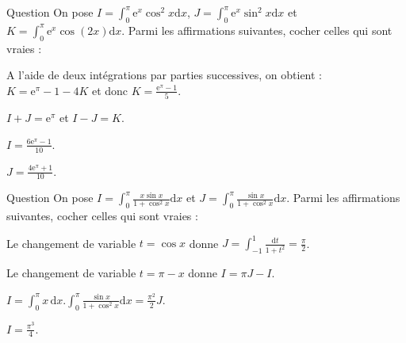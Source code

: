 \begin{multi}[multiple,feedback=
{Deux intégrations par parties successives, avec \(u=\cos (2x)\) et \(v=\mathrm{e}^x\) et ensuite avec \(u=\sin (2x)\) et \(v=\mathrm{e}^x\), donnent
\[K=\mathrm{e}^{\pi}-1+2\int _0^{\pi} \mathrm{e}^x\sin (2x)\mathrm{d}x=\mathrm{e}^{\pi}-1-4K\Rightarrow K=\frac{\mathrm{e}^{\pi}-1}{5}.\]
A l'aide des relations \(\cos ^2x+\sin ^2x=1\) et  \(\cos ^2x-\sin ^2x=\cos (2x)\), on obtient :
\[I+J=\mathrm{e}^{\pi}-1\mbox{ et }I-J=K\Rightarrow I=\frac{3(\mathrm{e}^{\pi}-1)}{5}\quad \mbox{et}\quad J=\frac{2(\mathrm{e}^{\pi}-1)}{5}.\]
}]{Question}
On pose \(\displaystyle I=\int _0^{\pi}\mathrm{e}^x\cos ^2x\mathrm{d}x\), \(\displaystyle J=\int _0^{\pi}\mathrm{e}^x\sin ^2x\mathrm{d}x\) et \(\displaystyle K=\int _0^{\pi}\mathrm{e}^x\cos (2x)\mathrm{d}x\). Parmi les affirmations suivantes, cocher celles qui sont vraies :

    \item* A l'aide de deux intégrations par parties successives, on obtient : \(\displaystyle K=\mathrm{e}^{\pi}-1-4K\) et donc \(\displaystyle K=\frac{\mathrm{e}^{\pi}-1}{5}\).
    \item \(\displaystyle I+J=\mathrm{e}^{\pi}\) et \(I-J=K\).
    \item \(\displaystyle I=\frac{6\mathrm{e}^{\pi}-1}{10}\).
    \item \(\displaystyle J=\frac{4\mathrm{e}^{\pi}+1}{10}\).
\end{multi}


\begin{multi}{Question}
On pose \(\displaystyle I=\int _0^{\pi}\frac{x\sin x}{1+\cos ^2x}\mathrm{d}x\) et \(\displaystyle J=\int _0^{\pi}\frac{\sin x}{1+\cos ^2x}\mathrm{d}x\). Parmi les affirmations suivantes, cocher celles qui sont vraies :

    \item* Le changement de variable \(t=\cos x\) donne \(\displaystyle J=\int _{-1}^1\frac{\mathrm{d}t}{1+t^2}=\frac{\pi}{2}\).
    \item* Le changement de variable \(t=\pi -x\) donne \(\displaystyle I=\pi J-I\).
    \item \(\displaystyle I=\int _0^{\pi}x\, \mathrm{d}x.\int _0^{\pi}\frac{\sin x}{1+\cos ^2x}\mathrm{d}x=\frac{\pi ^2}{2}J\).
    \item \(\displaystyle I=\frac{\pi ^3}{4}\).
\end{multi}


